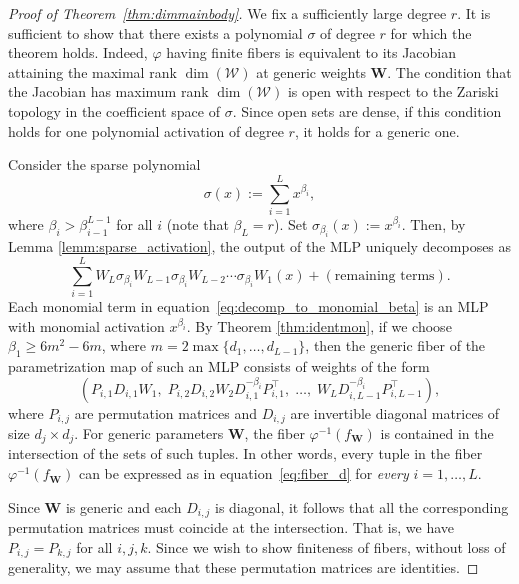 \documentclass{article} %
\def\eqref#1{equation~\ref{#1}}
\theoremstyle{plain}%
\theoremstyle{definition}
\theoremstyle{remark}
\begin{document}
\begin{proof}[Proof of Theorem~\ref{thm:dimmainbody}]
We fix a sufficiently large degree $r$.
It is sufficient to show that there exists a polynomial $\sigma$ of degree $r$ for which the theorem holds. 
Indeed, $\varphi$ having finite fibers is equivalent to its Jacobian attaining the maximal rank $\dim(\mathcal W)$ at generic weights $\mathbf{W}$.
The condition that the Jacobian has maximum rank $\dim(\mathcal W)$ is open with respect to the Zariski topology in the coefficient space of $\sigma$. Since open sets are dense, if this condition holds for one polynomial activation of degree $r$, it holds for  a generic one. 

Consider the sparse polynomial 
\begin{equation}
    \label{eq:sparse_activ}
    \sigma(x) := \sum_{i=1}^L  x^{\beta_i}, 
\end{equation}
where $\beta_i > \beta_{i-1}^{L-1}$ for all $i$ (note that $\beta_L = r$). Set $\sigma_{\beta_i}(x):=x^{\beta_i}$. Then, by Lemma \ref{lemm:sparse_activation}, the output of the MLP uniquely decomposes as
\begin{equation}
\label{eq:decomp_to_monomial_beta}
    \sum_{i=1}^L W_L \sigma_{\beta_{i}} W_{L-1} \sigma_{\beta_i} W_{L-2} \cdots \sigma_{\beta_i} W_1(x) + (\text{remaining terms}).
\end{equation}
Each monomial term in \eqref{eq:decomp_to_monomial_beta} is an MLP with monomial activation $x^{\beta_i}$. By Theorem \ref{thm:identmon}, if we choose $\beta_1 \geq 6m^2 - 6m$, where $m =  2\max\{ d_1,\dots,d_{L-1}\}$, then the generic fiber of the parametrization map of such an MLP consists of weights of the form
\begin{equation}
\label{eq:fiber_d}
\left(P_{i,1} D_{i,1} W_1,\; P_{i,2} D_{i,2} W_2 D_{i,1}^{-\beta_i} P_{i,1}^\top,\;\dots,\; W_L D_{i,L-1}^{-\beta_i} P_{i,L-1}^\top \right),
\end{equation}
where $P_{i,j}$ are permutation matrices and $D_{i,j}$ are invertible diagonal matrices of size $d_j \times d_j$. For generic parameters $\mathbf{W}$, the fiber $\varphi^{-1}(f_{\mathbf{W}})$ is contained in the intersection of the sets of such tuples.
In other words, every tuple in the fiber $\varphi^{-1}(f_{\mathbf{W}})$ can be expressed as in \eqref{eq:fiber_d} for \emph{every} $i=1, \ldots, L$.

Since $\mathbf{W}$ is generic and each $D_{i,j}$ is diagonal, it follows that all the corresponding permutation matrices must coincide at the intersection. That is, we have $P_{i,j} = P_{k,j}$ for all $i,j,k$. Since we wish to show finiteness of fibers, without loss of generality, we may assume that these permutation matrices are identities.


\end{proof}
\end{document}
